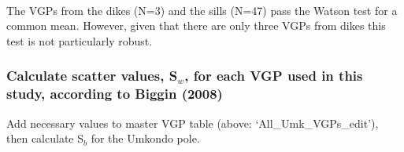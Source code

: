 \documentclass{article}
\begin{document}
    \begin{center}
    \end{center}
    { \hspace*{\fill} \\}
    
    The VGPs from the dikes (N=3) and the sills (N=47) pass the Watson test
for a common mean. However, given that there are only three VGPs from
dikes this test is not particularly robust.

    \subsubsection{\texorpdfstring{Calculate scatter values, S\(_{w}\), for
each VGP used in this study, according to Biggin
(2008)}{Calculate scatter values, S\_\{w\}, for each VGP used in this study, according to Biggin (2008)}}\label{calculate-scatter-values-sux5fw-for-each-vgp-used-in-this-study-according-to-biggin-2008}

    Add necessary values to master VGP table (above:
`All\_Umk\_VGPs\_edit'), then calculate S\(_{b}\) for the Umkondo pole.
\end{document}
